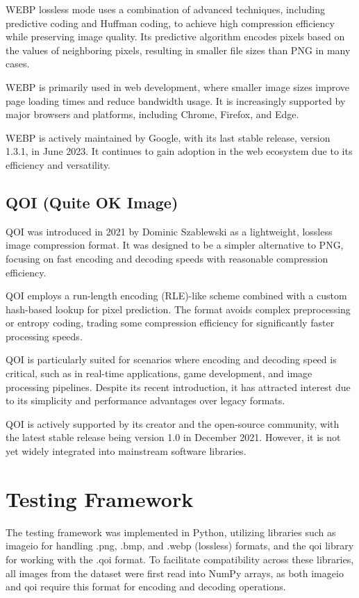 \documentclass[conference]{IEEEtran}
\begin{document}
WEBP lossless mode uses a combination of advanced techniques, including predictive coding and Huffman coding, to achieve high compression efficiency while preserving image quality. Its predictive algorithm encodes pixels based on the values of neighboring pixels, resulting in smaller file sizes than PNG in many cases.

WEBP is primarily used in web development, where smaller image sizes improve page loading times and reduce bandwidth usage. It is increasingly supported by major browsers and platforms, including Chrome, Firefox, and Edge.

WEBP is actively maintained by Google, with its last stable release, version 1.3.1, in June 2023. It continues to gain adoption in the web ecosystem due to its efficiency and versatility.

\subsection{QOI (Quite OK Image)}
QOI was introduced in 2021 by Dominic Szablewski as a lightweight, lossless image compression format. It was designed to be a simpler alternative to PNG, focusing on fast encoding and decoding speeds with reasonable compression efficiency.

QOI employs a run-length encoding (RLE)-like scheme combined with a custom hash-based lookup for pixel prediction. The format avoids complex preprocessing or entropy coding, trading some compression efficiency for significantly faster processing speeds.

QOI is particularly suited for scenarios where encoding and decoding speed is critical, such as in real-time applications, game development, and image processing pipelines. Despite its recent introduction, it has attracted interest due to its simplicity and performance advantages over legacy formats.

QOI is actively supported by its creator and the open-source community, with the latest stable release being version 1.0 in December 2021. However, it is not yet widely integrated into mainstream software libraries.

\section{Testing Framework}
The testing framework was implemented in Python, utilizing libraries such as imageio for handling .png, .bmp, and .webp (lossless) formats, and the qoi library for working with the .qoi format. To facilitate compatibility across these libraries, all images from the dataset were first read into NumPy arrays, as both imageio and qoi require this format for encoding and decoding operations.
\end{document}
